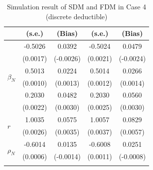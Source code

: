 \documentclass[11pt]{article}
\begin{document}
\begin{table}[!ht]
{{\begin{minipage}{0.5\textwidth}
\begin{tabular}{lcccc}
        & (s.e.) & (Bias) & (s.e.) & (Bias) \\
        \midrule
        \multirow{6}{*}{$\beta_N$} & -0.5026 & 0.0392 & -0.5024 & 0.0479 \\
         & (0.0017) & (-0.0026) & (0.0021) & (-0.0024) \\
        \cmidrule{2-5}
         & 0.5013 & 0.0224 & 0.5014 & 0.0266 \\
         & (0.0010) & (0.0013) & (0.0012) & (0.0014) \\
        \cmidrule{2-5}
         & 0.2030 & 0.0482 & 0.2030 & 0.0560 \\
         & (0.0022) & (0.0030) & (0.0025) & (0.0030) \\
        \midrule
        \multirow{2}{*}{$r$} & 1.0035 & 0.0575 & 1.0057 & 0.0829 \\
         & (0.0026) & (0.0035) & (0.0037) & (0.0057) \\
        \midrule
        \multirow{2}{*}{$\rho_N$} & -0.6014 & 0.0135 & -0.6008 & 0.0251 \\
         & (0.0006) & (-0.0014) & (0.0011) & (-0.0008) \\
        \hhline{=====}
        \end{tabular}
    \end{minipage}
}
}
\caption{Simulation result of SDM and FDM in Case 4 (discrete deductible)}\label{tab:AppSimEndCase4}
\end{table}
\end{document}
